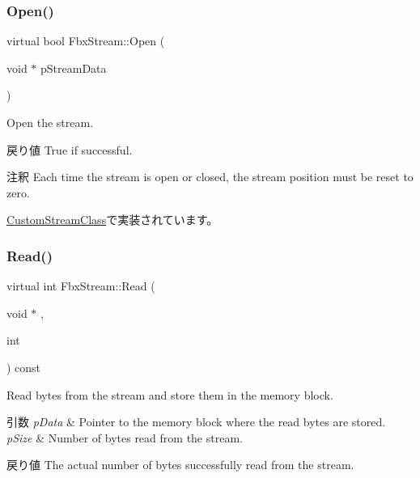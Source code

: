\subsubsection{\texorpdfstring{Open()}{Open()}}
{\footnotesize\ttfamily virtual bool Fbx\+Stream\+::\+Open (\begin{DoxyParamCaption}\item[{void $\ast$}]{p\+Stream\+Data }\end{DoxyParamCaption})\hspace{0.3cm}{\ttfamily [pure virtual]}}

Open the stream. \begin{DoxyReturn}{戻り値}
True if successful. 
\end{DoxyReturn}
\begin{DoxyRemark}{注釈}
Each time the stream is open or closed, the stream position must be reset to zero. 
\end{DoxyRemark}


\hyperlink{class_custom_stream_class_ade734834eb279b5b3fde05b6fb3cb352}{Custom\+Stream\+Class}で実装されています。

\mbox{\label{class_fbx_stream_a2621d456bfda1f0e4e3492bcc81ec2e6}} 
\subsubsection{\texorpdfstring{Read()}{Read()}\hspace{0.1cm}{\footnotesize\ttfamily [1/3]}}
{\footnotesize\ttfamily virtual int Fbx\+Stream\+::\+Read (\begin{DoxyParamCaption}\item[{void $\ast$}]{,  }\item[{int}]{ }\end{DoxyParamCaption}) const\hspace{0.3cm}{\ttfamily [pure virtual]}}

Read bytes from the stream and store them in the memory block. 
\begin{DoxyParams}{引数}
{\em p\+Data} & Pointer to the memory block where the read bytes are stored. \\
\hline
{\em p\+Size} & Number of bytes read from the stream. \\
\hline
\end{DoxyParams}
\begin{DoxyReturn}{戻り値}
The actual number of bytes successfully read from the stream. 
\end{DoxyReturn}



